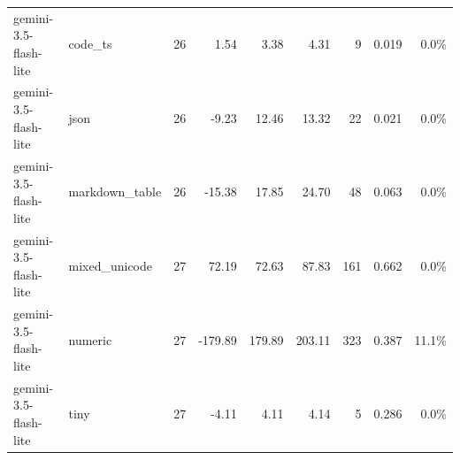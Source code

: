 \begin{table}[htbp]
\begin{tabular}{llrrrrrrr}
gemini-3.5-flash-lite & code\_ts & 26 & 1.54 & 3.38 & 4.31 & 9 & 0.019 & 0.0\% \\
gemini-3.5-flash-lite & json & 26 & -9.23 & 12.46 & 13.32 & 22 & 0.021 & 0.0\% \\
gemini-3.5-flash-lite & markdown\_table & 26 & -15.38 & 17.85 & 24.70 & 48 & 0.063 & 0.0\% \\
gemini-3.5-flash-lite & mixed\_unicode & 27 & 72.19 & 72.63 & 87.83 & 161 & 0.662 & 0.0\% \\
gemini-3.5-flash-lite & numeric & 27 & -179.89 & 179.89 & 203.11 & 323 & 0.387 & 11.1\% \\
gemini-3.5-flash-lite & tiny & 27 & -4.11 & 4.11 & 4.14 & 5 & 0.286 & 0.0\% \\
\bottomrule
\end{tabular}
\end{table}

